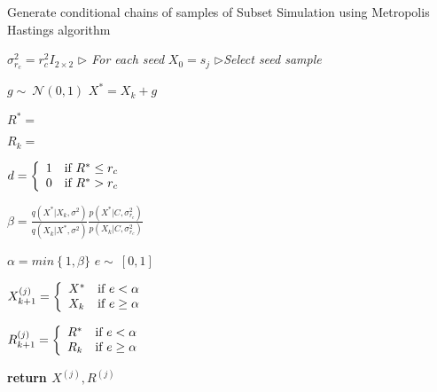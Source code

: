 \documentclass[journal]{IEEEtran}
\begin{document}
\begin{algorithm}\caption{Generate conditional chains of samples of Subset Simulation using Metropolis Hastings algorithm}
\label{alg:mh_ss}
\begin{algorithmic}[1]
	\State $\sigma_{r_{c}}^{2} = r_{c}^{2} I_{2 \times 2}$
	 \textit{$\triangleright$ For each seed}
		\State $X_{0} = s_{j}$	\textit{$\triangleright$Select seed sample}
			
			\State $g \sim{~} \mathcal{N}(0,1)$
			\State $X^{*} = X_{k} + g$

			\State $R^{*} = $ 
			
			\State $R_{k} = $ 
			
			\State $d = \left \{ \begin{array}{l l}
												1 & \text{if} \ R^{*} \leq r_{c}\\
												0 & \text{if} \ R^{*} > r_{c} \\
										  \end{array} \right .$
														
			\State $\beta = \frac{q(X^{*}|X_{k}, \sigma^{2})}{q(X_{k}|X^{*},\sigma^{2})}\frac{p(X^{*}|C, \sigma_{r_{c}}^{2})}{p(X_{k}|C, \sigma_{r_{c}}^{2})}$
			
			\State $\alpha = min \left \{ 1, \beta\} \right. $
			\State $e \sim{~} [0,1]$
			
\State $X_{k+1}^{(j)} = \left \{ \begin{array}{l l}
												X^{*} & \text{if} \ e < \alpha \\
												X_{k} & \text{if} \ e \geq \alpha \\
										  \end{array} \right .$
											
\State $R_{k+1}^{(j)} = \left \{ \begin{array}{l l}
												R^{*} & \text{if} \ e < \alpha \\
												R_{k} & \text{if} \ e \geq \alpha \\
										  \end{array} \right. $
		\EndFor	
	\EndFor

\State \textbf{return $X^{(j)}, R^{(j)}$}

\EndFunction
\end{algorithmic}
\end{algorithm}
\end{document}
